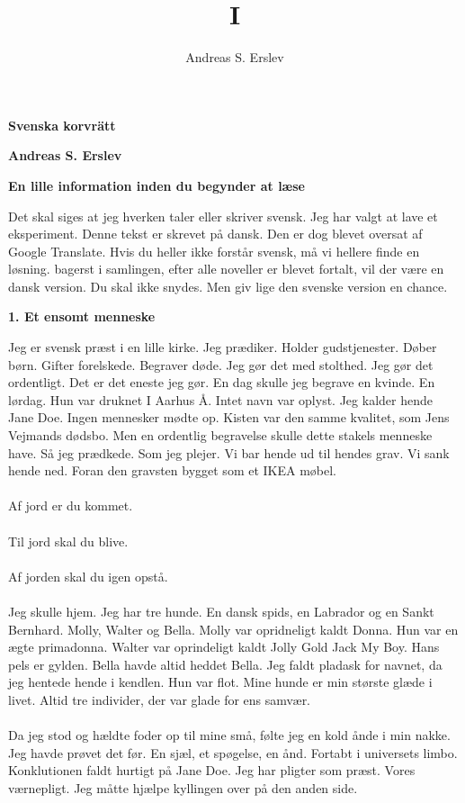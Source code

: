 \documentclass[]{article}
\title{I}
\author{Andreas S. Erslev}
\begin{document}
\begin{center}
	\Large\textbf{Svenska korvrätt}
\end{center}

\begin{center}
	\large\textbf{Andreas S. Erslev}
\end{center}

\begin{center}
	\large\textbf{En lille information inden du begynder at læse}
\end{center}

Det skal siges at jeg hverken taler eller skriver svensk. Jeg har valgt at lave et eksperiment. Denne tekst er skrevet på dansk. Den er dog blevet oversat af Google Translate. Hvis du heller ikke forstår svensk, må vi hellere finde en løsning. bagerst i samlingen, efter alle noveller er blevet fortalt, vil der være en dansk version. Du skal ikke snydes. Men giv lige den svenske version en chance.

\begin{center}
	\large\textbf{1. Et ensomt menneske}
\end{center}

Jeg er svensk præst i en lille kirke. Jeg prædiker. Holder gudstjenester. Døber børn. Gifter forelskede. Begraver døde. Jeg gør det med stolthed. Jeg gør det ordentligt. Det er det eneste jeg gør. En dag skulle jeg begrave en kvinde. En lørdag. Hun var druknet I Aarhus Å. Intet navn var oplyst. Jeg kalder hende Jane Doe. Ingen mennesker mødte op. Kisten var den samme kvalitet, som Jens Vejmands dødsbo. Men en ordentlig begravelse skulle dette stakels menneske have. Så jeg prædkede. Som jeg plejer. Vi bar hende ud til hendes grav. Vi sank hende ned. Foran den gravsten bygget som et IKEA møbel.
\\ \\
Af jord er du kommet.
\\ \\
Til jord skal du blive.
\\ \\
Af jorden skal du igen opstå.
\\ \\
Jeg skulle hjem. Jeg har tre hunde. En dansk spids, en Labrador og en Sankt Bernhard. Molly, Walter og Bella. Molly var opridneligt kaldt Donna. Hun var en ægte primadonna. Walter var oprindeligt kaldt Jolly Gold Jack My Boy. Hans pels er gylden. Bella havde altid heddet Bella. Jeg faldt pladask for navnet, da jeg hentede hende i kendlen. Hun var flot. Mine hunde er min største glæde i livet. Altid tre individer, der var glade for ens samvær. 
\\ \\
Da jeg stod og hældte foder op til mine små, følte jeg en kold ånde i min nakke. Jeg havde prøvet det før. En sjæl, et spøgelse, en ånd. Fortabt i universets limbo. Konklutionen faldt hurtigt på Jane Doe. Jeg har pligter som præst. Vores værnepligt. Jeg måtte hjælpe kyllingen over på den anden side. 
\end{document}
